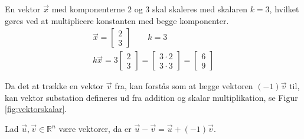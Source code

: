 \begin{eks}
En vektor $\vec{x}$ med komponenterne $2$ og $3$ skal skaleres med skalaren $k=3$, hvilket gøres ved at multiplicere konstanten med begge komponenter.
\begin{align*}
\vec{x}=\begin{bmatrix}
2\\
3
\end{bmatrix}\qquad k=3\\
k\vec{x}=3
\begin{bmatrix}
2\\
3
\end{bmatrix}
=
\begin{bmatrix}
3\cdot2\\
3\cdot3
\end{bmatrix}
=
\begin{bmatrix}
6\\
9
\end{bmatrix}
\end{align*}
\end{eks}
Da det at trække en vektor $\vec{v}$ fra, kan forstås som at lægge vektoren $(-1) \vec{v}$ til, kan vektor substation defineres ud fra addition og skalar multiplikation, se Figur \ref{fig:vektorskalar}.
\begin{defn}
Lad $\vec{u}, \vec{v} \in \mathds{R}^n$ være vektorer, da er $\vec{u}-\vec{v}= \vec{u} + (-1) \vec{v}$.
\end{defn}

